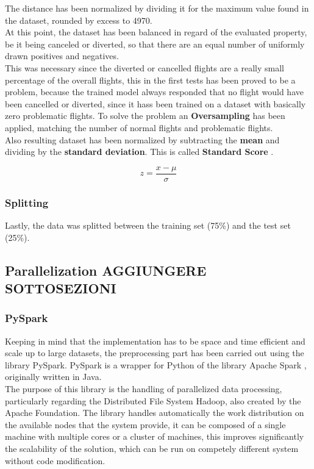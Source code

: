 \documentclass[
	letterpaper, %
	10pt, %
]{class}
\begin{document}
The distance has been normalized by dividing it for the maximum value found in the dataset, rounded by excess to 4970.\\

At this point, the dataset has been balanced in regard of the evaluated property, be it being canceled or diverted, so that there are an equal number of uniformly drawn positives and negatives.\\

This was necessary since the diverted or cancelled flights are a really small percentage of the overall flights,
this in the first tests has been proved to be a problem, because the trained model always responded that no flight would have been cancelled or diverted, since it hass been trained on a dataset with basically zero problematic flights.
To solve the problem an \textbf{Oversampling} has been applied, matching the number of normal flights and problematic flights.\\

Also resulting dataset has been normalized by subtracting the \textbf{mean} and dividing by the \textbf{standard deviation}. This is called \textbf{Standard Score} \cite{normalization}.

$$ z = \frac{x - \mu}{\sigma} $$

\subsubsection{Splitting}
Lastly, the data was splitted between the training set (75\%) and the test set (25\%).\\

\subsection{Parallelization AGGIUNGERE SOTTOSEZIONI}

\subsubsection{PySpark}
Keeping in mind that the implementation has to be space and time efficient and scale up to large datasets, the preprocessing part has been carried out using the library PySpark.
PySpark is a wrapper for Python of the library Apache Spark \cite{spark}, originally written in Java.\\

The purpose of this library is the handling of parallelized data processing, particularly regarding the Distributed File System Hadoop, also created by the Apache Foundation.
The library handles automatically the work distribution on the available nodes that the system provide, it can be composed of a single machine with multiple cores or a cluster of machines, this improves significantly the scalability of the solution, which can be run on competely different system without code modification.\\
\end{document}

